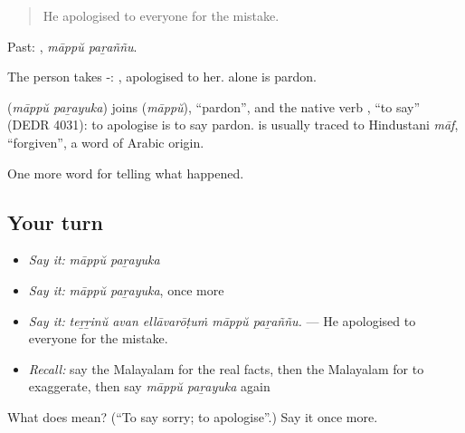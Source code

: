 \begin{quote}
He apologised to everyone for the mistake.
\end{quote}

Past:  , \emph{māppŭ paṟaññu}.

The person takes -:   , apologised to her.  alone is pardon.

\begin{cousinweb}
\textbf{ } (\emph{māppŭ paṟayuka}) joins  (\emph{māppŭ}), \textquotedblleft{}pardon\textquotedblright{}, and the native verb , \textquotedblleft{}to say\textquotedblright{} (DEDR 4031): to apologise is to say pardon.  is usually traced to Hindustani \emph{māf}, \textquotedblleft{}forgiven\textquotedblright{}, a word of Arabic origin.
\end{cousinweb}

\begin{grammarlens}[title={What you've built}]
One more word for telling what happened.
\end{grammarlens}

\subsection*{Your turn}
\begin{itemize}
\raggedright
  \item \emph{Say it:} \emph{māppŭ paṟayuka}
  \item \emph{Say it:} \emph{māppŭ paṟayuka}, once more
  \item \emph{Say it:} \emph{teṟṟinŭ avan ellāvarōṭuṁ māppŭ paṟaññu.} — He apologised to everyone for the mistake.
  \item \emph{Recall:} say the Malayalam for the real facts, then the Malayalam for to exaggerate, then say \emph{māppŭ paṟayuka} again
\end{itemize}

\begin{tcolorbox}[breakable,colback=teal!4,colframe=teal!35!black,title={Before you move on}]
What does   mean? (\textquotedblleft{}To say sorry; to apologise\textquotedblright{}.) Say it once more.
\end{tcolorbox}

